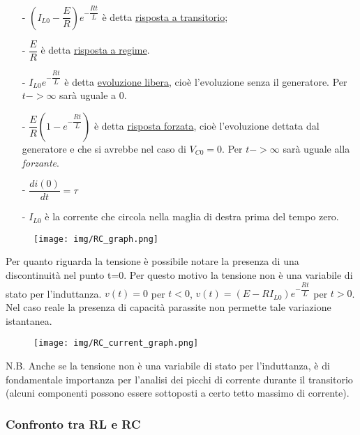 \documentclass{article}
\begin{document}
\medskip
\begin{itemize}
    \item[-] $(I_{L0}-\dfrac{E}{R})e^{-\dfrac{Rt}{L}}$ è detta \underline{risposta a transitorio};
    \item[-] $\dfrac{E}{R}$ è detta \underline{risposta a regime}.
    \item[-] $I_{L0}e^{-\dfrac{Rt}{L}}$ è detta \underline{evoluzione libera}, cioè l'evoluzione senza il generatore. Per $t->\infty$ sarà uguale a 0.
    \item[-] $\dfrac{E}{R}(1-e^{-\dfrac{Rt}{L}})$ è detta \underline{risposta forzata}, cioè l'evoluzione dettata dal generatore e che si avrebbe
    nel caso di $V_{C0}=0$. Per $t->\infty$ sarà uguale alla \textit{forzante}.
    \item[-] $\dfrac{d i(0)}{d t}=\tau$
    \item[-] $I_{L0}$ è la corrente che circola nella maglia di destra prima del tempo zero. 
\end{itemize}

\pagebreak

\begin{figure}[h!]
    \begin{center}
        \texttt{[image: img/RC\_graph.png]}
    \end{center}
\end{figure}

\noindent Per quanto riguarda la tensione è possibile notare la presenza di una discontinuità nel punto t=0. Per questo motivo la tensione non è
una variabile di stato per l'induttanza. $v(t)=0$ per $t<0$, $v(t)=(E-RI_{L0})e^{-\dfrac{Rt}{L}}$ per $t>0$.
Nel caso reale la presenza di capacità parassite non permette tale variazione istantanea.
\begin{figure}[h!]
    \begin{center}
        \texttt{[image: img/RC\_current\_graph.png]}
    \end{center}
\end{figure}

\noindent N.B. Anche se la tensione non è una variabile di stato per l'induttanza, è di fondamentale importanza per l'analisi dei picchi di corrente
durante il transitorio (alcuni componenti possono essere sottoposti a certo tetto massimo di corrente).

\subsubsection{Confronto tra RL e RC}
\end{document}

